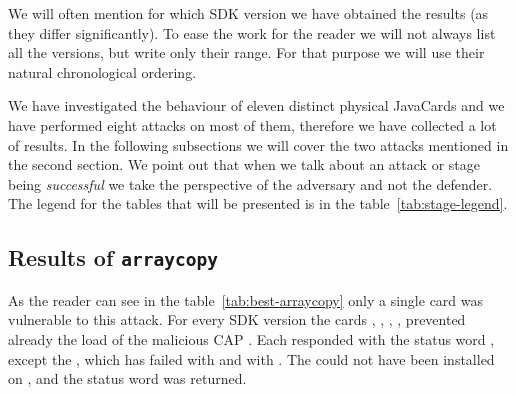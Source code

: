 \documentclass{../llncs/llncs}
\begin{document}

        We will often mention for which SDK version we have obtained the results (as they differ significantly). To ease the work for the reader we will not always list all the versions, but write only their range. For that purpose we will use their natural chronological ordering.%

        We have investigated the behaviour of eleven distinct physical JavaCards and we have performed eight attacks on most of them, therefore we have collected a lot of results. In the following subsections we will cover the two attacks mentioned in the second section. We point out that when we talk about an attack or stage being \textit{successful} we take the perspective of the adversary and not the defender. The legend for the tables that will be presented is in the table~\ref{tab:stage-legend}.

\setlength{\tabcolsep}{.5pt}
\renewcommand{\arraystretch}{.20}
\setlength{\floatsep}{0pt}

\begin{table}[htb]
    \captionsetup{font=footnotesize}
    \parbox[b][][b]{.45\linewidth}{
        
    }
    \hfill
    \parbox[b][][b]{.45\linewidth}{
        
    }
\end{table}

\subsection{Results of \texttt{arraycopy}}\label{subsec:result-arraycopy}
            As the reader can see in the table~\ref{tab:best-arraycopy} only a single card was vulnerable to this attack. For every SDK version the cards \Cnewcard, \Fcard, \Gcard, \Hcard, \Inewcard prevented already the load of the malicious CAP \vulnscap. Each responded with the status word \swwrongdata, except the \Cnewcard, which has failed with \swunknown and \Inewcard with \swwrongdata. The \vulnscap could not have been installed on \Icard, \Ccard and the status word \swconditionsnotsatisfied was returned.
\end{document}
